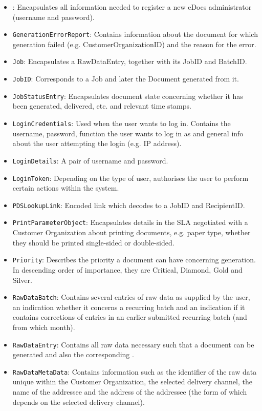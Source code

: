 \begin{itemize}
	\item {}: Encapsulates all information needed to register a new eDocs administrator (username and password).
	\item \texttt{GenerationErrorReport}: Contains information about the document for which generation failed (e.g. CustomerOrganizationID) and the reason for the error.
	\item \texttt{Job}: Encapsulates a RawDataEntry, together with its JobID and BatchID.
	\item \texttt{JobID}: Corresponds to a Job and later the Document generated from it.
	\item \texttt{JobStatusEntry}: Encapsulates document state concerning whether it has been generated, delivered, etc. and relevant time stamps.
	\item \texttt{LoginCredentials}: Used when the user wants to log in. Contains the username, password, function the user wants to log in as and general info about the user attempting the login (e.g. IP address).
	\item \texttt{LoginDetails}: A pair of username and password.
	\item \texttt{LoginToken}: Depending on the type of user, authorises the user to perform certain actions within the system.
	\item \texttt{PDSLookupLink}: Encoded link which decodes to a JobID and RecipientID.
	\item \texttt{PrintParameterObject}: Encapsulates details in the SLA negotiated with a Customer Organization about printing documents, e.g. paper type, whether they should be printed single-sided or double-sided.
	\item \texttt{Priority}: Describes the priority a document can have concerning generation. In descending order of importance, they are Critical, Diamond, Gold and Silver.
	\item \texttt{RawDataBatch}: Contains several entries of raw data as supplied by the user, an indication whether it concerns a recurring batch and an indication if it contains corrections of entries in an earlier submitted recurring batch (and from which month). 
	\item \texttt{RawDataEntry}: Contains all raw data necessary such that a document can be generated and also the corresponding .
	\item \texttt{RawDataMetaData}: Contains information such as the identifier of the raw data unique within the Customer Organization, the selected delivery channel, the name of the addressee and the address of the addressee (the form of which depends on the selected delivery channel).

\end{itemize}
